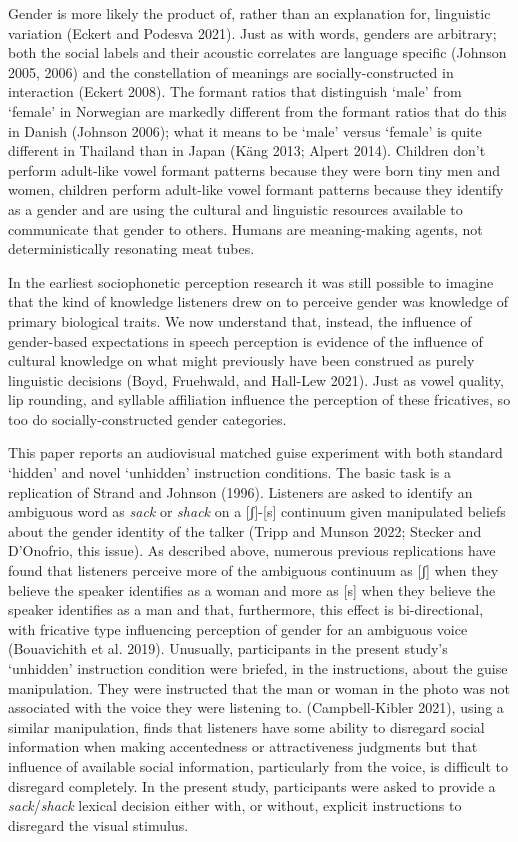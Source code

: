 \documentclass[
  letterpaper,
  DIV=11,
  numbers=noendperiod]{scrartcl}
\begin{document}
Gender is more likely the product of, rather than an explanation for,
linguistic variation (Eckert and Podesva 2021). Just as with words,
genders are arbitrary; both the social labels and their acoustic
correlates are language specific (Johnson 2005, 2006) and the
constellation of meanings are socially-constructed in interaction
(Eckert 2008). The formant ratios that distinguish `male' from `female'
in Norwegian are markedly different from the formant ratios that do this
in Danish (Johnson 2006); what it means to be `male' versus `female' is
quite different in Thailand than in Japan (Käng 2013; Alpert 2014).
Children don't perform adult-like vowel formant patterns because they
were born tiny men and women, children perform adult-like vowel formant
patterns because they identify as a gender and are using the cultural
and linguistic resources available to communicate that gender to others.
Humans are meaning-making agents, not deterministically resonating meat
tubes.

In the earliest sociophonetic perception research it was still possible
to imagine that the kind of knowledge listeners drew on to perceive
gender was knowledge of primary biological traits. We now understand
that, instead, the influence of gender-based expectations in speech
perception is evidence of the influence of cultural knowledge on what
might previously have been construed as purely linguistic decisions
(Boyd, Fruehwald, and Hall-Lew 2021). Just as vowel quality, lip
rounding, and syllable affiliation influence the perception of these
fricatives, so too do socially-constructed gender categories.

This paper reports an audiovisual matched guise experiment with both
standard `hidden' and novel `unhidden' instruction conditions. The basic
task is a replication of Strand and Johnson (1996). Listeners are asked
to identify an ambiguous word as \emph{sack} or \emph{shack} on a
{[}ʃ{]}-{[}s{]} continuum given manipulated beliefs about the gender
identity of the talker (Tripp and Munson 2022; Stecker and D'Onofrio,
this issue). As described above, numerous previous replications have
found that listeners perceive more of the ambiguous continuum as {[}ʃ{]}
when they believe the speaker identifies as a woman and more as {[}s{]}
when they believe the speaker identifies as a man and that, furthermore,
this effect is bi-directional, with fricative type influencing
perception of gender for an ambiguous voice (Bouavichith et al. 2019).
Unusually, participants in the present study's `unhidden' instruction
condition were briefed, in the instructions, about the guise
manipulation. They were instructed that the man or woman in the photo
was not associated with the voice they were listening to.
(Campbell-Kibler 2021), using a similar manipulation, finds that
listeners have some ability to disregard social information when making
accentedness or attractiveness judgments but that influence of available
social information, particularly from the voice, is difficult to
disregard completely. In the present study, participants were asked to
provide a \emph{sack}/\emph{shack} lexical decision either with, or
without, explicit instructions to disregard the visual stimulus.
\end{document}
